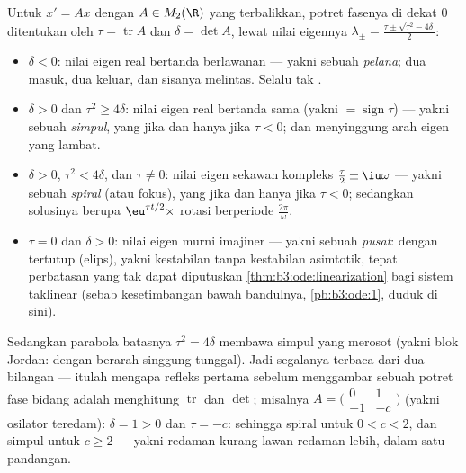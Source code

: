 \begin{example}
\label{ex:b3:ode:planeclassification}
Untuk $x' = Ax$ dengan $A \in M_2(\R)$ yang terbalikkan, potret
fasenya di dekat $0$ ditentukan oleh $\tau = \operatorname{tr}A$
dan $\delta = \det A$, lewat nilai eigennya $\lambda_\pm
= \frac{\tau \pm \sqrt{\tau^2 - 4\delta}}2$:
\begin{itemize}
  \item $\delta < 0$: nilai eigen real bertanda berlawanan ---
        yakni sebuah \emph{pelana}; dua  masuk, dua keluar,
        dan sisanya melintas. Selalu tak .
  \item $\delta > 0$ dan $\tau^2 \geq 4\delta$: nilai eigen real
        bertanda sama (yakni $= \operatorname{sign}\tau$) --- yakni sebuah
        \emph{simpul}, yang  jika dan hanya jika $\tau < 0$; dan 
        menyinggung arah eigen yang lambat.
  \item $\delta > 0$, $\tau^2 < 4\delta$, dan $\tau \neq 0$:
        nilai eigen sekawan kompleks $\frac\tau2 \pm
        \iu\omega$ --- yakni sebuah \emph{spiral} (atau fokus), yang  jika dan hanya jika
        $\tau < 0$; sedangkan solusinya berupa
        $\eu^{\tau t/2}\times$ rotasi berperiode
        $\frac{2\pi}\omega$.
  \item $\tau = 0$ dan $\delta > 0$: nilai eigen murni
        imajiner --- yakni sebuah \emph{pusat}: dengan  tertutup
        (elips), yakni kestabilan tanpa kestabilan asimtotik,
        tepat perbatasan yang tak dapat diputuskan
        \cref{thm:b3:ode:linearization} bagi sistem
        taklinear (sebab kesetimbangan bawah bandulnya,
        \cref{pb:b3:ode:1}, duduk di sini).
\end{itemize}
Sedangkan parabola batasnya $\tau^2 = 4\delta$ membawa simpul yang
merosot (yakni blok Jordan: dengan  berarah singgung
tunggal). Jadi segalanya terbaca dari dua bilangan ---
itulah mengapa refleks pertama sebelum menggambar sebuah potret fase
bidang adalah menghitung $\operatorname{tr}$ dan $\det$; misalnya
$A = \bigl(\begin{smallmatrix}0 & 1\\ -1 &
-c\end{smallmatrix}\bigr)$ (yakni osilator teredam): $\delta = 1 >
0$ dan $\tau = -c$: sehingga spiral  untuk $0 < c < 2$, dan simpul 
untuk $c \geq 2$ --- yakni redaman kurang lawan redaman lebih, dalam satu
pandangan.
\end{example}

